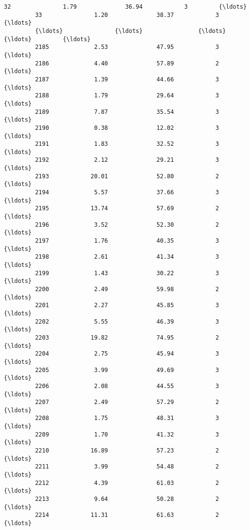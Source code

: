 \documentclass[11pt]{llncs}
\begin{document}
\begin{Verbatim}[commandchars=\\\{\}]
         32               1.79              36.94            3         {\ldots}           
         33               1.20              38.37            3         {\ldots}           
         {\ldots}               {\ldots}                {\ldots}          {\ldots}         {\ldots}           
         2185             2.53              47.95            3         {\ldots}           
         2186             4.40              57.89            2         {\ldots}           
         2187             1.39              44.66            3         {\ldots}           
         2188             1.79              29.64            3         {\ldots}           
         2189             7.87              35.54            3         {\ldots}           
         2190             0.38              12.02            3         {\ldots}           
         2191             1.83              32.52            3         {\ldots}           
         2192             2.12              29.21            3         {\ldots}           
         2193            20.01              52.80            2         {\ldots}           
         2194             5.57              37.66            3         {\ldots}           
         2195            13.74              57.69            2         {\ldots}           
         2196             3.52              52.30            2         {\ldots}           
         2197             1.76              40.35            3         {\ldots}           
         2198             2.61              41.34            3         {\ldots}           
         2199             1.43              30.22            3         {\ldots}           
         2200             2.49              59.98            2         {\ldots}           
         2201             2.27              45.85            3         {\ldots}           
         2202             5.55              46.39            3         {\ldots}           
         2203            19.82              74.95            2         {\ldots}           
         2204             2.75              45.94            3         {\ldots}           
         2205             3.99              49.69            3         {\ldots}           
         2206             2.08              44.55            3         {\ldots}           
         2207             2.49              57.29            2         {\ldots}           
         2208             1.75              48.31            3         {\ldots}           
         2209             1.70              41.32            3         {\ldots}           
         2210            16.89              57.23            2         {\ldots}           
         2211             3.99              54.48            2         {\ldots}           
         2212             4.39              61.03            2         {\ldots}           
         2213             9.64              50.28            2         {\ldots}           
         2214            11.31              61.63            2         {\ldots}           
         

\end{Verbatim}
\end{document}
